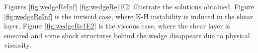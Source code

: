 \documentclass[preprint,12pt]{elsarticle}
\begin{document}
Figures \ref{fig:wedgeReInf} \ref{fig:wedgeRe1E2} illustrate 
the solutions obtained. 
Figure \ref{fig:wedgeReInf} is the inviscid case, where 
K-H instability is induced in the shear layer. 
Figure  \ref{fig:wedgeRe1E2} is the viscous case, where 
the shear layer is smeared and some shock structures
behind the wedge disappears due to physical viscosity.


















\end{document}
